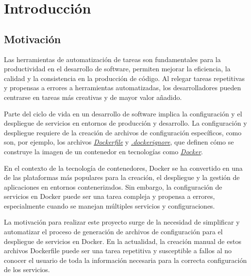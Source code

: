 \documentclass[12pt, a4paper, twoside]{article}
\begin{document}

\newpage




\newpage


\newpage

\tableofcontents
\newpage












\section{Introducción}
\label{sec:Introduccion}

\subsection{Motivación}
Las herramientas de automatización de tareas son fundamentales para la productividad en el desarrollo de software, permiten mejorar la eficiencia, la calidad y la consistencia en la producción de código.
Al relegar tareas repetitivas y propensas a errores a herramientas automatizadas, los desarrolladores pueden centrarse en tareas más creativas y de mayor valor añadido.

Parte del ciclo de vida en un desarrollo de software implica la configuración y el despliegue de servicios en entornos de producción y desarrollo.
La configuración y despliegue requiere de la creación de archivos de configuración específicos, como son, por ejemplo, los archivos \hyperref[sec:Dockerfile]{\emph{Dockerfile}} y \hyperref[sec:dockerignore]{\emph{.dockerignore}}, que definen cómo se construye la imagen de un contenedor en tecnologías como \hyperref[sec:Docker]{\emph{Docker}}.

En el contexto de la tecnología de contenedores, Docker se ha convertido en una de las plataformas más populares para la creación, el despliegue y la gestión de aplicaciones en entornos contenerizados. 
Sin embargo, la configuración de servicios en Docker puede ser una tarea compleja y propensa a errores, especialmente cuando se manejan múltiples servicios y configuraciones.

La motivación para realizar este proyecto surge de la necesidad de simplificar y automatizar el proceso de generación de archivos de configuración para el despliegue de servicios en Docker. 
En la actualidad, la creación manual de estos archivos Dockerfile puede ser una tarea repetitiva y susceptible a fallos al no conocer el usuario de toda la información necesaria para la correcta configuración de los servicios.
\end{document}
